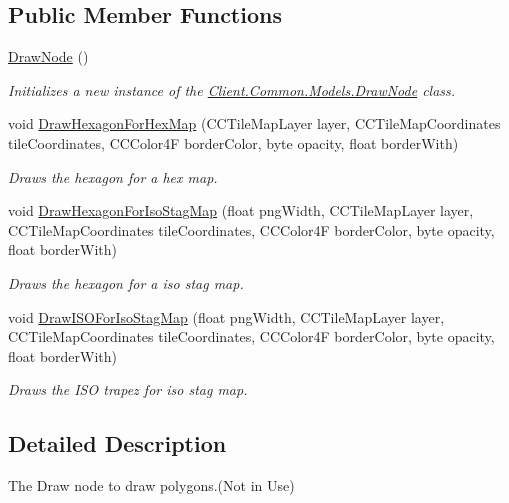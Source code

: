 \subsection*{Public Member Functions}
\begin{DoxyCompactItemize}
\item 
\hyperlink{classClient_1_1Common_1_1Models_1_1DrawNode_a2068ce66fd508c5ecdd30c0e28604a9b}{Draw\+Node} ()
\begin{DoxyCompactList}\small\item\em Initializes a new instance of the \hyperlink{classClient_1_1Common_1_1Models_1_1DrawNode}{Client.\+Common.\+Models.\+Draw\+Node} class. \end{DoxyCompactList}\item 
void \hyperlink{classClient_1_1Common_1_1Models_1_1DrawNode_a8acad135d936298475940d5ba6b5e4d1}{Draw\+Hexagon\+For\+Hex\+Map} (C\+C\+Tile\+Map\+Layer layer, C\+C\+Tile\+Map\+Coordinates tile\+Coordinates, C\+C\+Color4\+F border\+Color, byte opacity, float border\+With)
\begin{DoxyCompactList}\small\item\em Draws the hexagon for a hex map. \end{DoxyCompactList}\item 
void \hyperlink{classClient_1_1Common_1_1Models_1_1DrawNode_af759c63ae3fc8d138925290c91bbd41f}{Draw\+Hexagon\+For\+Iso\+Stag\+Map} (float png\+Width, C\+C\+Tile\+Map\+Layer layer, C\+C\+Tile\+Map\+Coordinates tile\+Coordinates, C\+C\+Color4\+F border\+Color, byte opacity, float border\+With)
\begin{DoxyCompactList}\small\item\em Draws the hexagon for a iso stag map. \end{DoxyCompactList}\item 
void \hyperlink{classClient_1_1Common_1_1Models_1_1DrawNode_a0b4fd6fccd6e7c7f0d6a889f7bcb2ea5}{Draw\+I\+S\+O\+For\+Iso\+Stag\+Map} (float png\+Width, C\+C\+Tile\+Map\+Layer layer, C\+C\+Tile\+Map\+Coordinates tile\+Coordinates, C\+C\+Color4\+F border\+Color, byte opacity, float border\+With)
\begin{DoxyCompactList}\small\item\em Draws the I\+S\+O trapez for iso stag map. \end{DoxyCompactList}\end{DoxyCompactItemize}


\subsection{Detailed Description}
The Draw node to draw polygons.(Not in Use) 



